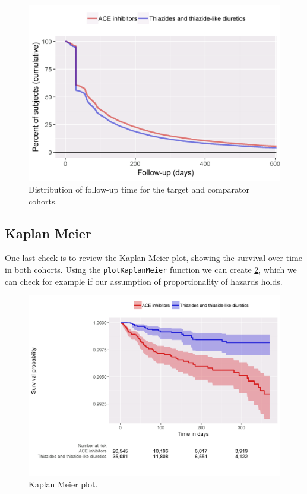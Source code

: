 \documentclass[]{book}
\begin{document}
\begin{figure}

{\centering \includegraphics[width=0.8\linewidth]{images/PopulationLevelEstimation/followUp} 

}

\caption{Distribution of follow-up time for the target and comparator cohorts.}\label{fig:followUp}
\end{figure}

\subsection{Kaplan Meier}\label{kaplan-meier}

One last check is to review the Kaplan Meier plot, showing the survival
over time in both cohorts. Using the \texttt{plotKaplanMeier} function
we can create \ref{fig:kmPlot}, which we can check for example if our
assumption of proportionality of hazards holds.

\begin{figure}

{\centering \includegraphics[width=1\linewidth]{images/PopulationLevelEstimation/kmPlot} 

}

\caption{Kaplan Meier plot.}\label{fig:kmPlot}
\end{figure}
\end{document}
